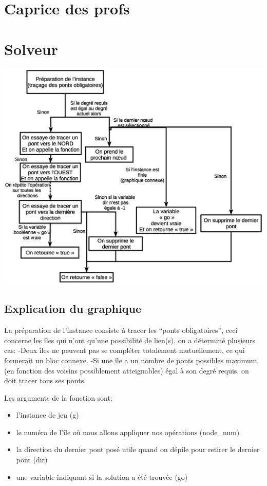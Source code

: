 \documentclass[12pt]{report}
\begin{document}
\chapter{Caprice des profs}

\chapter{Solveur}
\includegraphics[width = 1.00\textwidth]{explication_solveur.eps}
\section{Explication du graphique}
La préparation de l'instance consiste à tracer les ``ponts obligatoires'', ceci concerne les îles qui n'ont qu'une possibilité de lien(s),
on a déterminé plusieurs cas:\newline
-Deux îles ne peuvent pas se compléter totalement mutuellement, ce qui formerait un bloc connexe.\newline
-Si une île a un nombre de ponts possibles maximum (en fonction des voisins possiblement atteignables) égal à son degré requis, on doit tracer tous ses ponts.\newline

Les arguments de la fonction sont:
\begin{itemize}
\item l'instance de jeu (g)
\item le numéro de l'île où nous allons appliquer nos opérations (node\_num)
\item la direction du dernier pont posé utile quand on dépile pour retirer le dernier pont (dir)
\item une variable indiquant si la solution a été trouvée (go)
\end{itemize}
\end{document}
